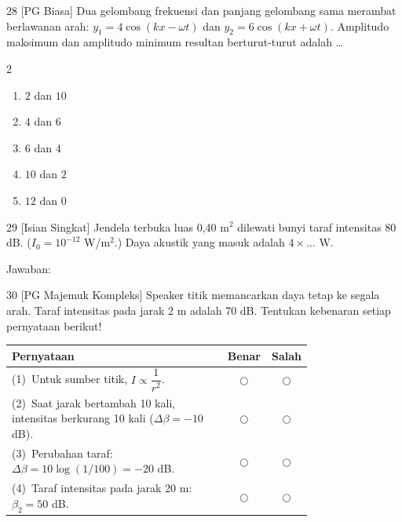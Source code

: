 \documentclass[11pt]{article}
\newenvironment{pilB}{%
  \par\smallskip\begin{multicols}{2}
  \begin{enumerate}[label=(\alph*),leftmargin=*,itemsep=1pt,topsep=3pt]}%
  {\end{enumerate}\end{multicols}}
\begin{document}
\begin{soal}{28 \normalfont\small[PG Biasa]}
Dua gelombang frekuensi dan panjang gelombang sama merambat berlawanan arah:
$y_1=4\cos(kx-\omega t)$ dan $y_2=6\cos(kx+\omega t)$. Amplitudo maksimum
dan amplitudo minimum resultan berturut-turut adalah \ldots
\begin{pilB}
  \item $2$ dan $10$ \item $4$ dan $6$ \item $6$ dan $4$
  \item $10$ dan $2$ \item $12$ dan $0$
\end{pilB}
\end{soal}

\begin{soal}{29 \normalfont\small[Isian Singkat]}
Jendela terbuka luas 0{,}40 m$^2$ dilewati bunyi taraf intensitas 80 dB.
($I_0=10^{-12}$ W/m$^2$.) Daya akustik yang masuk adalah $4\times\ldots$ W.

\vspace{0.4em}
\noindent Jawaban:\enspace\underline{\hspace{4cm}}
\end{soal}

\begin{soal}{30 \normalfont\small[PG Majemuk Kompleks]}
Speaker titik memancarkan daya tetap ke segala arah. Taraf intensitas pada
jarak 2 m adalah 70 dB. Tentukan kebenaran setiap pernyataan berikut!

\par\smallskip
{\renewcommand{\arraystretch}{1.4}%
\begin{tabular}{@{}p{0.76\linewidth}cc@{}}
\hline\textbf{Pernyataan}&\textbf{Benar}&\textbf{Salah}\\\hline
(1)~Untuk sumber titik, $I\propto\dfrac{1}{r^2}$.&$\bigcirc$&$\bigcirc$\\
(2)~Saat jarak bertambah 10 kali, intensitas berkurang 10 kali ($\Delta\beta=-10$ dB).&$\bigcirc$&$\bigcirc$\\
(3)~Perubahan taraf: $\Delta\beta=10\log(1/100)=-20$ dB.&$\bigcirc$&$\bigcirc$\\
(4)~Taraf intensitas pada jarak 20 m: $\beta_2=50$ dB.&$\bigcirc$&$\bigcirc$\\\hline
\end{tabular}}
\end{soal}
\end{document}
